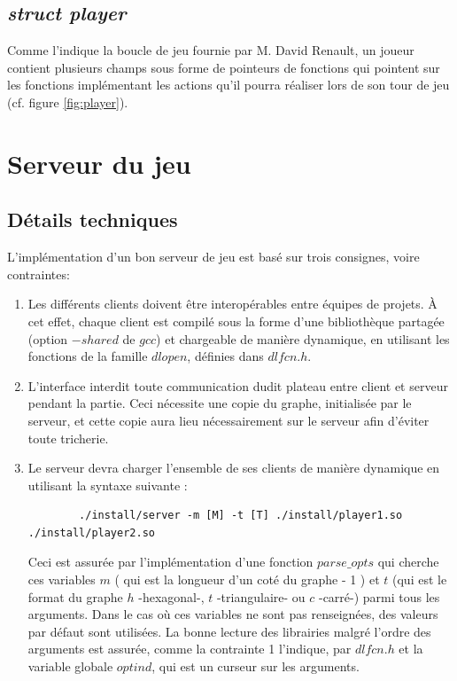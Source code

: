 \documentclass{article}
\begin{document}
\subsection{\textit{struct player}}
Comme l'indique la boucle de jeu fournie par M. David Renault, un joueur contient plusieurs champs sous forme de pointeurs de fonctions qui pointent sur les fonctions implémentant les actions qu'il pourra réaliser lors de son tour de jeu (cf. figure \ref{fig:player}).



\section{Serveur du jeu}
\subsection{Détails techniques}
L'implémentation d'un bon serveur de jeu est basé sur trois consignes, voire contraintes:
\begin{enumerate}
    \item Les différents clients doivent être interopérables entre équipes de projets. \`A cet effet, chaque client est compilé sous la forme d'une bibliothèque partagée (option $-shared$ de $gcc$) et chargeable de manière dynamique, en utilisant les fonctions de la famille $dlopen$, définies dans $dlfcn.h$.
    \item L'interface interdit toute communication dudit plateau entre client et serveur pendant la partie. Ceci nécessite une copie du graphe, initialisée par le serveur, et cette copie aura lieu nécessairement sur le serveur afin d'éviter toute tricherie.
    \item Le serveur devra charger l'ensemble de ses clients de manière dynamique en utilisant la syntaxe suivante :
    \begin{verbatim}
        ./install/server -m [M] -t [T] ./install/player1.so ./install/player2.so
    \end{verbatim}
    Ceci est assurée par l'implémentation d'une fonction $parse\_opts$ qui cherche ces variables $m$ ( qui est la longueur d'un coté du graphe - 1 ) et $t$ (qui est le format du graphe $h$ -hexagonal-, $t$ -triangulaire- ou $c$ -carré-) parmi tous les arguments. Dans le cas o\`u ces variables ne sont pas renseignées, des valeurs par défaut sont utilisées. La bonne lecture des librairies malgré l'ordre des arguments est assurée, comme la contrainte 1 l'indique, par $dlfcn.h$ et la variable globale $optind$, qui est un curseur sur les arguments.  
\end{enumerate}
\end{document}
